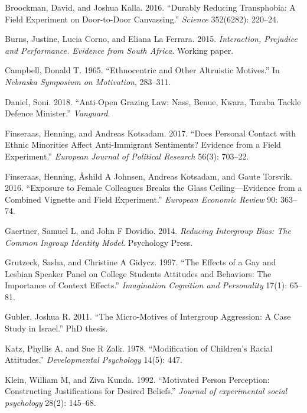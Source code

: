 \documentclass[11pt]{article}
\begin{document}
\hypertarget{ref-broockman2016durably}{}
Broockman, David, and Joshua Kalla. 2016. ``Durably Reducing
Transphobia: A Field Experiment on Door-to-Door Canvassing.''
\emph{Science} 352(6282): 220--24.

\hypertarget{ref-burns2015interaction}{}
Burns, Justine, Lucia Corno, and Eliana La Ferrara. 2015.
\emph{Interaction, Prejudice and Performance. Evidence from South
Africa}. Working paper.

\hypertarget{ref-campbell1965ethno}{}
Campbell, Donald T. 1965. ``Ethnocentric and Other Altruistic Motives.''
In \emph{Nebraska Symposium on Motivation}, 283--311.

\hypertarget{ref-daniel2018anti}{}
Daniel, Soni. 2018. ``Anti-Open Grazing Law: Nass, Benue, Kwara, Taraba
Tackle Defence Minister.'' \emph{Vanguard}.

\hypertarget{ref-finseraas2017does}{}
Finseraas, Henning, and Andreas Kotsadam. 2017. ``Does Personal Contact
with Ethnic Minorities Affect Anti-Immigrant Sentiments? Evidence from a
Field Experiment.'' \emph{European Journal of Political Research} 56(3):
703--22.

\hypertarget{ref-finseraas2016women}{}
Finseraas, Henning, Åshild A Johnsen, Andreas Kotsadam, and Gaute
Torsvik. 2016. ``Exposure to Female Colleagues Breaks the Glass
Ceiling---Evidence from a Combined Vignette and Field Experiment.''
\emph{European Economic Review} 90: 363--74.

\hypertarget{ref-gaertner2014reducing}{}
Gaertner, Samuel L, and John F Dovidio. 2014. \emph{Reducing Intergroup
Bias: The Common Ingroup Identity Model}. Psychology Press.

\hypertarget{ref-grutzeck1997effects}{}
Grutzeck, Sasha, and Christine A Gidycz. 1997. ``The Effects of a Gay
and Lesbian Speaker Panel on College Students Attitudes and Behaviors:
The Importance of Context Effects.'' \emph{Imagination Cognition and
Personality} 17(1): 65--81.

\hypertarget{ref-gubler2011diss}{}
Gubler, Joshua R. 2011. ``The Micro-Motives of Intergroup Aggression: A
Case Study in Israel.'' PhD thesis.

\hypertarget{ref-katz1978race}{}
Katz, Phyllis A, and Sue R Zalk. 1978. ``Modification of Children's
Racial Attitudes.'' \emph{Developmental Psychology} 14(5): 447.

\hypertarget{ref-klein1992motivated}{}
Klein, William M, and Ziva Kunda. 1992. ``Motivated Person Perception:
Constructing Justifications for Desired Beliefs.'' \emph{Journal of
experimental social psychology} 28(2): 145--68.
\end{document}

